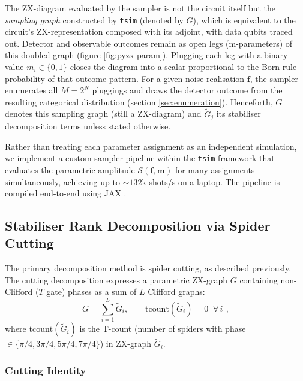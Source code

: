 \documentclass[a4paper,onecolumn,11pt,accepted=2026-06-10]{quantumarticle}
\begin{document}
The ZX-diagram evaluated by the sampler is not the circuit itself but the
\textit{sampling graph} constructed by \texttt{tsim} \cite{QuEraComputing_tsim_2026} (denoted by $G$), which is equivalent to the circuit's ZX-representation composed with its adjoint, with data qubits traced out. Detector and observable outcomes remain as open legs (m-parameters) of this doubled graph (figure \ref{fig:pyzx-param}). Plugging each leg with a binary value $m_i \in \{0,1\}$ closes the diagram into a scalar proportional to the Born-rule probability of that outcome pattern. For a given noise realisation $\mathbf{f}$, the sampler enumerates all $M = 2^N$ pluggings and draws the detector outcome from the resulting categorical distribution (section \ref{sec:enumeration}). Henceforth, $G$ denotes this sampling graph (still a ZX-diagram) and $\tilde{G}_j$ its stabiliser decomposition terms unless stated otherwise.

Rather than treating each parameter assignment as an independent simulation, we implement a custom sampler pipeline within the
\texttt{tsim} \cite{QuEraComputing_tsim_2026} framework that evaluates the parametric amplitude $\mathcal{S}(\mathbf{f}, \mathbf{m})$ for many assignments simultaneously, achieving up to ${\sim}132\text{k}$ shots/s on a laptop. The pipeline is compiled end-to-end using JAX \cite{jax2018github}.

\subsection{Stabiliser Rank Decomposition via Spider Cutting}
\label{sec:zx-decomposition}

The primary decomposition method is spider cutting, as described previously. The cutting decomposition expresses a parametric ZX-graph $G$ containing non-Clifford ($T$ gate) phases as a sum of $L$ Clifford graphs:
\begin{equation}
\label{eq:cutting-sum}
    G = \sum_{i=1}^{L} \tilde{G}_i, \qquad
    \mathrm{tcount}(\tilde{G}_i) = 0 \;\;\forall\, i\, \ ,
\end{equation}
where $\mathrm{tcount}(\tilde{G}_i)$ is the T-count (number of spiders with phase $\in\{\pi/4, 3\pi/4,5\pi/4,7\pi/4\}$) in ZX-graph $\tilde{G}_i$.
\subsubsection{Cutting Identity}
\label{sec:cutting-identity}
\end{document}
